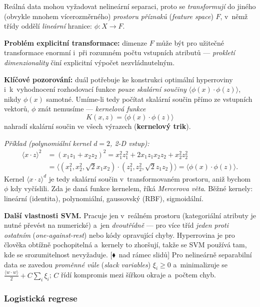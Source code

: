 \documentclass[11pt,a4paper]{article}
\theoremstyle{definition}
\newcommand{\mimo}{\textcolor{markcol}{\textsf{\footnotesize[$\blacklozenge$~nad rámec slidů]}}}
\begin{document}
\begin{defbox}
Reálná data mohou vyžadovat nelineární separaci, proto se \emph{transformují} do jiného (obvykle
mnohem vícerozměrného) \emph{prostoru příznaků} (\emph{feature space}) $F$, v~němž třídy oddělí
\emph{lineární} hranice: $\phi:X\to F$.

\textbf{Problém explicitní transformace:} dimenze $F$ může být pro užitečné transformace enormní
i~při rozumném počtu vstupních atributů --- \emph{prokletí dimenzionality} činí explicitní
výpočet nezvládnutelným.

\textbf{Klíčové pozorování:} duál potřebuje ke konstrukci optimální hyperroviny i~k~vyhodnocení
rozhodovací funkce \emph{pouze skalární součiny} $\langle\phi(x)\cdot\phi(z)\rangle$, nikdy
$\phi(x)$ samotné. Umíme-li tedy počítat skalární součin přímo ze vstupních vektorů, $\phi$ znát
nemusíme --- \emph{kernelová funkce}
\[ K(x,z)=\langle\phi(x)\cdot\phi(z)\rangle \]
nahradí skalární součin ve všech výrazech (\textbf{kernelový trik}).

\emph{Příklad (polynomiální kernel $d=2$, 2-D vstup):}
\begin{align*}
\langle x\cdot z\rangle^2&=(x_1z_1+x_2z_2)^2=x_1^2z_1^2+2x_1z_1x_2z_2+x_2^2z_2^2\\
&=\big\langle (x_1^2,x_2^2,\sqrt2 x_1x_2)\cdot(z_1^2,z_2^2,\sqrt2 z_1z_2)\big\rangle
 =\langle\phi(x)\cdot\phi(z)\rangle.
\end{align*}
Kernel $\langle x\cdot z\rangle^d$ je tedy skalární součin v~transformovaném prostoru, aniž
bychom $\phi$ kdy vyčíslili. Zda je daná funkce kernelem, říká \emph{Mercerova věta}. Běžné
kernely: lineární (identita), polynomiální, gaussovský (RBF), sigmoidální.
\end{defbox}

\textbf{Další vlastnosti SVM.} Pracuje jen v~reálném prostoru (kategoriální atributy je nutné
převést na numerické) a~jen \emph{dvoutřídně} --- pro více tříd \emph{jeden proti ostatním}
(\emph{one-against-rest}) nebo kódy opravující chyby. Hyperrovina je pro člověka obtížně
pochopitelná a~kernely to zhoršují, takže se SVM používá tam, kde se srozumitelnost
nevyžaduje. \mimo{} Pro nelineárně separabilní data se zavedou \emph{proměnné vůle}
(\emph{slack variables}) $\xi_i\ge 0$ a~minimalizuje se
$\frac{\langle w\cdot w\rangle}{2}+C\sum_i\xi_i$; $C$ řídí kompromis mezi šířkou okraje
a~počtem chyb.

\subsubsection{Logistická regrese}
\label{ssec:logreg}
\end{document}
